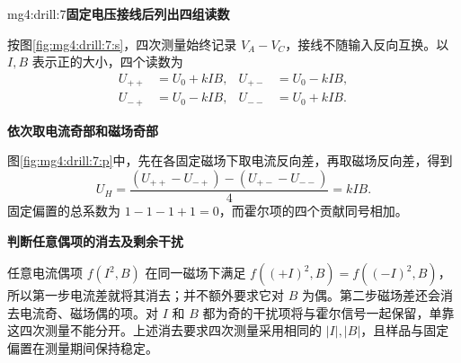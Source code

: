 \begin{drillsolution}{mg4:drill:7}\textbf{固定电压接线后列出四组读数}\par\nobreak
按图\ref{fig:mg4:drill:7:s}，四次测量始终记录 $V_A-V_C$，接线不随输入反向互换。以 $I,B$ 表示正的大小，四个读数为
\[
\begin{aligned}
U_{++}&=U_0+kIB,& U_{+-}&=U_0-kIB,\\
U_{-+}&=U_0-kIB,& U_{--}&=U_0+kIB.
\end{aligned}
\]


\par\medskip{}\noindent\textbf{依次取电流奇部和磁场奇部}\par\nobreak
图\ref{fig:mg4:drill:7:p}中，先在各固定磁场下取电流反向差，再取磁场反向差，得到
\[
\boxed{U_H=\frac{(U_{++}-U_{-+})-(U_{+-}-U_{--})}{4}=kIB}.
\]
固定偏置的总系数为 $1-1-1+1=0$，而霍尔项的四个贡献同号相加。



\par\medskip{}\noindent\textbf{判断任意偶项的消去及剩余干扰}\par\nobreak
任意电流偶项 $f(I^2,B)$ 在同一磁场下满足 $f((+I)^2,B)=f((-I)^2,B)$，所以第一步电流差就将其消去；并不额外要求它对 $B$ 为偶。第二步磁场差还会消去电流奇、磁场偶的项。对 $I$ 和 $B$ 都为奇的干扰项将与霍尔信号一起保留，单靠这四次测量不能分开。上述消去要求四次测量采用相同的 $|I|,|B|$，且样品与固定偏置在测量期间保持稳定。\end{drillsolution}

